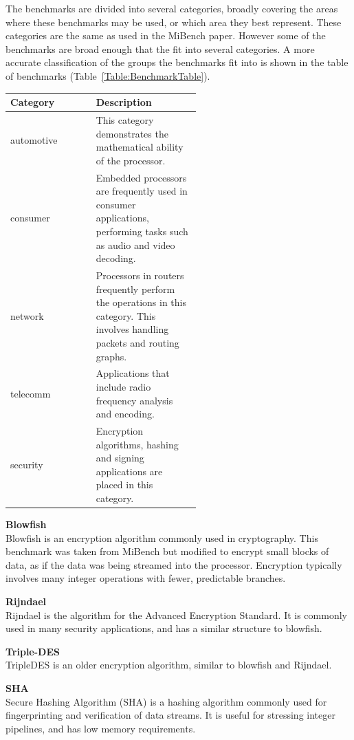 \documentclass[twocolumn]{article}
\begin{document}
The benchmarks are divided into several categories, broadly covering the areas where these benchmarks may be used, or which area they best represent. These categories are the same as used in the MiBench paper. However some of the benchmarks are broad enough that the fit into several categories. A more accurate classification of the groups the benchmarks fit into is shown in the table of benchmarks (Table~\ref{Table:BenchmarkTable}).

\begin{center}
	\begin{tabular}{l p{0.55\linewidth}}
		Category &	Description \\
		\hline
		automotive 	& This category demonstrates the mathematical ability of the processor. \\
		consumer	& Embedded processors are frequently used in consumer applications, performing tasks such as audio and video decoding. \\
		network		& Processors in routers frequently perform the operations in this category. This involves handling packets and routing graphs. \\
		telecomm	& Applications that include radio frequency analysis and encoding. \\
		security	& Encryption algorithms, hashing and signing applications are placed in this category. \\
	\end{tabular}
\end{center}

\vspace{3mm}
\textbf{Blowfish}\\
Blowfish is an encryption algorithm commonly used in cryptography. This benchmark was taken from MiBench but modified to encrypt small blocks of data, as if the data was being streamed into the processor. Encryption typically involves many integer operations with fewer, predictable branches.

\vspace{3mm}
\textbf{Rijndael}\\
Rijndael is the algorithm for the Advanced Encryption Standard. It is commonly used in many security applications, and has a similar structure to blowfish.

\vspace{3mm}
\textbf{Triple-DES}\\
TripleDES is an older encryption algorithm, similar to blowfish and Rijndael.

\vspace{3mm}
\textbf{SHA}\\
Secure Hashing Algorithm (SHA) is a hashing algorithm commonly used for fingerprinting and verification of data streams. It is useful for stressing integer pipelines, and has low memory requirements.
\end{document}
